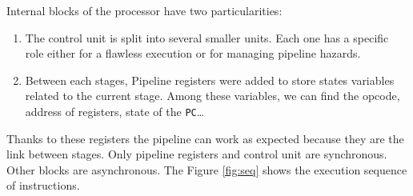 \documentclass[10pt,a4paper]{article}
\theoremstyle{definition}%
\begin{document}
Internal blocks of the processor have two particularities:
\begin{enumerate}
\item The control unit is split into several smaller units. Each one has a specific role either for a flawless execution or for managing pipeline hazards.
\item Between each stages, Pipeline registers were added to store states variables related to the current stage. Among these variables, we can find the opcode, address of registers, state of the \verb!PC!\dots 
\end{enumerate}
Thanks to these registers the pipeline can work as expected because they are the link between stages.
Only pipeline registers and control unit are synchronous. Other blocks are asynchronous.
The Figure \vref{fig:seq} shows the execution sequence of instructions.
\end{document}
